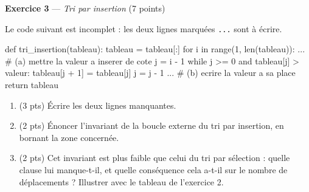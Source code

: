 \bigskip

\textbf{Exercice 3} --- \textit{Tri par insertion} \hfill (7 points)

Le code suivant est incomplet : les deux lignes marquées \lstinline{...} sont à écrire.

\begin{python}
def tri_insertion(tableau):
    tableau = tableau[:]
    for i in range(1, len(tableau)):
        ...                     # (a) mettre la valeur a inserer de cote
        j = i - 1
        while j >= 0 and tableau[j] > valeur:
            tableau[j + 1] = tableau[j]
            j = j - 1
        ...                     # (b) ecrire la valeur a sa place
    return tableau
\end{python}

\begin{enumerate}
  \item (3 pts) Écrire les deux lignes manquantes.
  \item (2 pts) Énoncer l'invariant de la boucle externe du tri par insertion, en bornant la zone concernée.
  \item (2 pts) Cet invariant est plus faible que celui du tri par sélection : quelle clause lui manque-t-il, et quelle conséquence cela a-t-il sur le nombre de déplacements ? Illustrer avec le tableau de l'exercice 2.
\end{enumerate}


